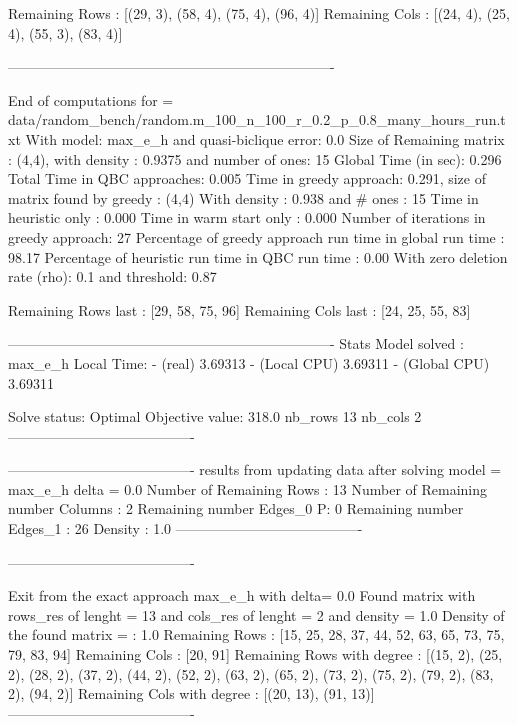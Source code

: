  Remaining Rows  : [(29, 3), (58, 4), (75, 4), (96, 4)]
 Remaining  Cols  : [(24, 4), (25, 4), (55, 3), (83, 4)]

----------------------------------------------------------------------
 
    End of computations for = data/random_bench/random.m_100_n_100_r_0.2_p_0.8_many_hours_run.txt 
    With  model: max_e_h and quasi-biclique error: 0.0
    Size of Remaining matrix : (4,4), with  density : 0.9375 and number of ones: 15
    Global Time (in sec): 0.296
    Total Time in QBC approaches: 0.005
    Time in greedy approach: 0.291,  size of matrix found by greedy : (4,4) 
    With density : 0.938 and # ones : 15 
    Time in heuristic only : 0.000 
    Time in warm start only : 0.000
    Number of iterations in greedy approach: 27
    Percentage of greedy approach run time in global run time : 98.17%
    Percentage of heuristic run time in QBC run time : 0.00%
    With zero deletion rate (rho): 0.1 and threshold: 0.87
    
 Remaining Rows last : [29, 58, 75, 96]
 Remaining  Cols  last : [24, 25, 55, 83]
 
 
 ----------------------------------------------------------------------
Stats
 Model solved : max_e_h  Local Time:  - (real) 3.69313 - (Local CPU) 3.69311 - (Global CPU) 3.69311

 Solve status: Optimal Objective value: 318.0 nb_rows 13 nb_cols 2
----------------------------------------

----------------------------------------
 results from updating data after solving model = max_e_h  delta =   0.0
Number of Remaining  Rows  : 13
Number of Remaining number Columns : 2
Remaining  number Edges_0 P: 0 Remaining  number Edges_1 : 26 Density : 1.0
----------------------------------------

----------------------------------------

Exit from the exact  approach  max_e_h  with delta= 0.0 Found matrix with rows_res of lenght = 13  and cols_res of lenght = 2 and density = 1.0
 Density of the found matrix =  : 1.0
 Remaining Rows  : [15, 25, 28, 37, 44, 52, 63, 65, 73, 75, 79, 83, 94]
 Remaining  Cols  : [20, 91]
 Remaining Rows with degree : [(15, 2), (25, 2), (28, 2), (37, 2), (44, 2), (52, 2), (63, 2), (65, 2), (73, 2), (75, 2), (79, 2), (83, 2), (94, 2)]
 Remaining  Cols with degree : [(20, 13), (91, 13)]
----------------------------------------

